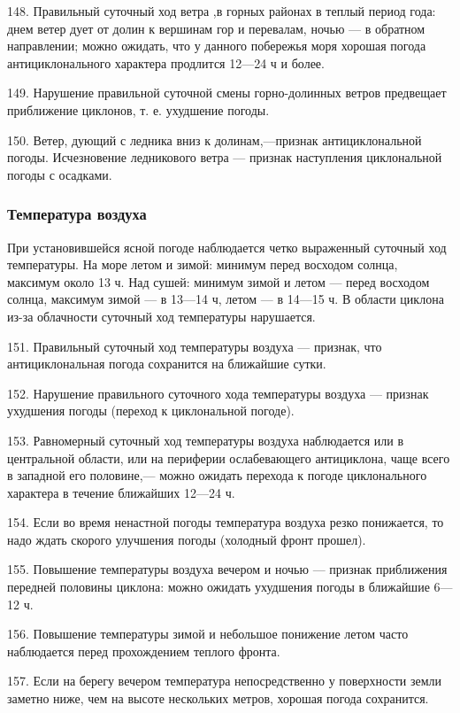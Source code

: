 148. Правильный суточный ход ветра ,в горных районах в теплый период года: днем ветер дует от долин к вершинам гор и перевалам, ночью — в обратном направлении; можно ожидать, что у данного побережья моря хорошая погода антициклонального характера продлится 12—24 ч и более.

149. Нарушение правильной суточной смены горно-долинных ветров предвещает приближение циклонов, т. е. ухудшение погоды.

150. Ветер, дующий с ледника вниз к долинам,—признак антициклональной погоды. Исчезновение ледникового ветра — признак наступления циклональной погоды с осадками.

\subsubsection{Температура воздуха}

При установившейся ясной погоде наблюдается четко выраженный суточный ход температуры. На море летом и зимой: минимум перед восходом солнца, максимум около 13 ч. Над сушей: минимум зимой и летом — перед восходом солнца, максимум зимой — в 13—14 ч, летом — в 14—15 ч. В области циклона из-за облачности суточный ход температуры нарушается.

151. Правильный суточный ход температуры воздуха — признак, что антициклональная погода сохранится на ближайшие сутки.

152. Нарушение правильного суточного хода температуры воздуха — признак ухудшения погоды (переход к циклональной погоде).

153. Равномерный суточный ход температуры воздуха наблюдается или в центральной области, или на периферии ослабевающего антициклона, чаще всего в западной его половине,— можно ожидать перехода к погоде циклонального характера в течение ближайших 12—24 ч.

154. Если во время ненастной погоды температура воздуха резко понижается, то надо ждать скорого улучшения погоды (холодный фронт прошел).

155. Повышение температуры воздуха вечером и ночью — признак приближения передней половины циклона: можно ожидать ухудшения погоды в ближайшие 6— 12 ч.

156. Повышение температуры зимой и небольшое понижение летом часто наблюдается перед прохождением теплого фронта.

157. Если на берегу вечером температура непосредственно у поверхности земли заметно ниже, чем на высоте нескольких метров, хорошая погода сохранится.

